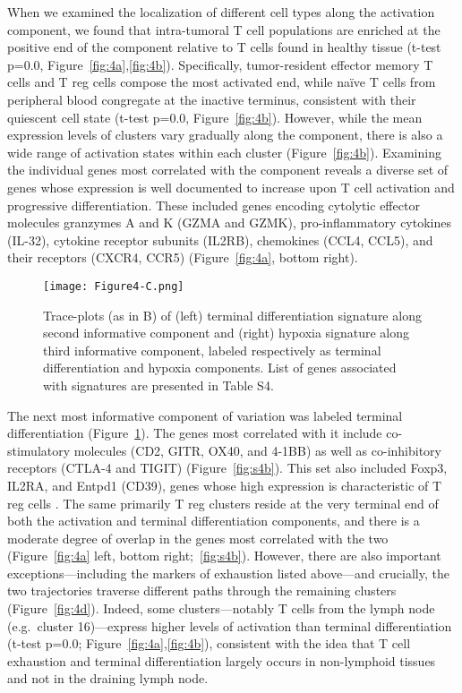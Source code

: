 When we examined the localization of different cell types along the activation component, we found that intra-tumoral T cell populations are enriched at the positive end of the component relative to T cells found in healthy tissue (t-test p=0.0, Figure~\ref{fig:4a},\ref{fig:4b}).
Specifically, tumor-resident effector memory T cells and T reg cells compose the most activated end, while naïve T cells from peripheral blood congregate at the inactive terminus, consistent with their quiescent cell state (t-test p=0.0, Figure~\ref{fig:4b}).
However, while the mean expression levels of clusters vary gradually along the component, there is also a wide range of activation states within each cluster (Figure~\ref{fig:4b}).
Examining the individual genes most correlated with the component reveals a diverse set of genes whose expression is well documented to increase upon T cell activation and progressive differentiation.
These included genes encoding cytolytic effector molecules granzymes A and K (GZMA and GZMK), pro-inflammatory cytokines (IL-32), cytokine receptor subunits (IL2RB), chemokines (CCL4, CCL5), and their receptors (CXCR4, CCR5) (Figure~\ref{fig:4a}, bottom right).

\begin{figure}
\centering
\texttt{[image: Figure4-C.png]}
\caption{Trace-plots (as in B) of (left) terminal differentiation signature along second informative component and (right) hypoxia signature along third informative component, labeled respectively as terminal differentiation and hypoxia components.
List of genes associated with signatures are presented in Table S4.}
\label{fig:4c}
\end{figure}

The next most informative component of variation was labeled terminal differentiation (Figure~\ref{fig:4c}). 
The genes most correlated with it include co-stimulatory molecules (CD2, GITR, OX40, and 4-1BB) as well as co-inhibitory receptors (CTLA-4 and TIGIT) (Figure~\ref{fig:s4b}).
This set also included Foxp3, IL2RA, and Entpd1 (CD39), genes whose high expression is characteristic of T reg cells \citep{Josefowicz2012}.
The same primarily T reg clusters reside at the very terminal end of both the activation and terminal differentiation components, and there is a moderate degree of overlap in the genes most correlated with the two (Figure~\ref{fig:4a} left, bottom right;~\ref{fig:s4b}).
However, there are also important exceptions---including the markers of exhaustion listed above---and crucially, the two trajectories traverse different paths through the remaining clusters (Figure~\ref{fig:4d}).
Indeed, some clusters---notably T cells from the lymph node (e.g.\ cluster 16)---express higher levels of activation than terminal differentiation (t-test p=0.0; Figure~\ref{fig:4a},\ref{fig:4b}), consistent with the idea that T cell exhaustion and terminal differentiation largely occurs in non-lymphoid tissues and not in the draining lymph node.

